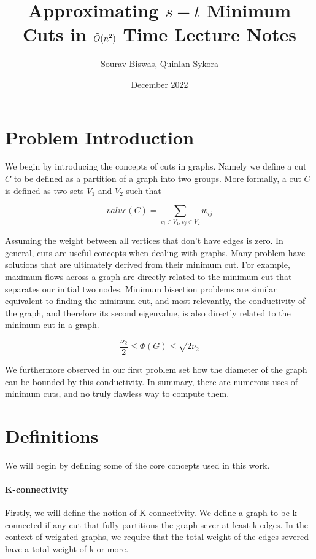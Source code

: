 \documentclass[11pt]{article}
\title{Approximating $s-t$ Minimum Cuts in $\Tilde{O}(n^2)$ Time Lecture Notes}
\author{Sourav Biswas, Quinlan Sykora}
\date{December 2022}
\begin{document}
\maketitle

\section{Problem Introduction}

We begin by introducing the concepts of cuts in graphs. Namely we define a cut $C$ to be defined as a partition of a graph into two groups. More formally, a cut $C$ is defined as two sets $V_1$ and $V_2$ such that 

\begin{equation}
    value(C) = \sum_{v_i \in V_1, v_j \in V_2} w_{ij}
\end{equation}

Assuming the weight between all vertices that don't have edges is zero. In general, cuts are useful concepts when dealing with graphs. Many problem have solutions that are ultimately derived from their minimum cut. For example, maximum flows across a graph are directly related to the minimum cut that separates our initial two nodes. Minimum bisection problems are similar equivalent to finding the minimum cut, and most relevantly, the conductivity of the graph, and therefore its second eigenvalue, is also directly related to the minimum cut in a graph.

\begin{equation}
    \frac{\nu_2}{2} \leq \Phi(G) \leq \sqrt{2 \nu_2}
\end{equation}

We furthermore observed in our first problem set how the diameter of the graph can be bounded by this conductivity. In summary, there are numerous uses of minimum cuts, and no truly flawless way to compute them.

\section{Definitions}

We will begin by defining some of the core concepts used in this work. 

\paragraph{K-connectivity}
Firstly, we will define the notion of K-connectivity. We define a graph to be k-connected if any cut that fully partitions the graph sever at least k edges. In the context of weighted graphs, we require that the total weight of the edges severed have a total weight of k or more. 
\end{document}

